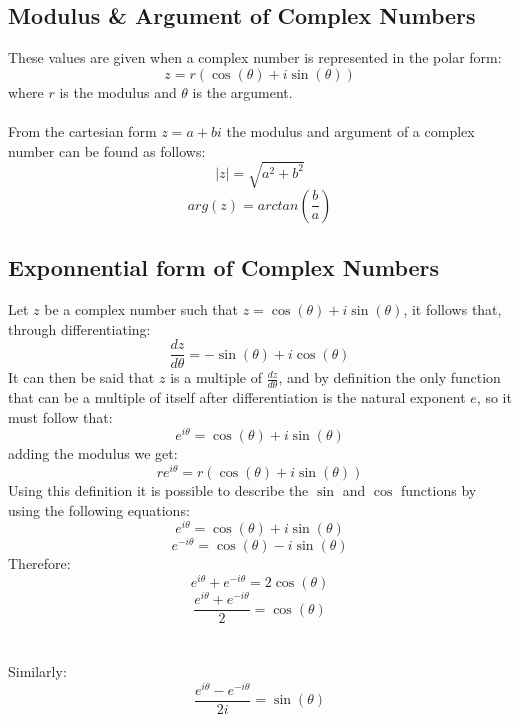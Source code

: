 \documentclass{article}
\begin{document}
                \subsection{Modulus \& Argument of Complex Numbers}
                	These values are given when a complex number is represented in the polar form:
                	\[z=r\left(\cos\left(\theta\right) + i\sin\left(\theta\right)\right)\]
                	where \(r\) is the modulus and \(\theta\) is the argument. \\\\
                	From the cartesian form \(z=a+bi\) the modulus and argument of a complex number can be found as follows:
                	\[|z|=\sqrt{a^2 + b^2}\]
                	\[arg\left(z\right) = arctan\left(\frac{b}{a}\right)\]
		\subsection{Exponnential form of Complex Numbers}
			Let \(z\) be a complex number such that \(z=\cos\left(\theta\right) +i\sin\left(\theta\right)\), it follows that, through differentiating:
			 \[\frac{dz}{d\theta}=-\sin\left(\theta\right) +i\cos\left(\theta\right)\]
			It can then be said that \(z\) is a multiple of \(\frac{dz}{d\theta}\), and by definition the only function that can be a multiple of itself after differentiation is the natural exponent \(e\), so it must follow that:
			\[e^{i\theta}=\cos\left(\theta\right) +i\sin\left(\theta\right)\]
			adding the modulus we get:
			\[re^{i\theta} = r(\cos\left(\theta\right) +i\sin\left(\theta\right))\]
			Using this definition it is possible to describe the \(\sin\) and \(\cos\) functions by using the following equations:
			\[e^{i\theta}= \cos\left(\theta\right)+i\sin\left(\theta\right)\]
			\[e^{-i\theta}=\cos\left(\theta\right)-i\sin\left(\theta\right)\]
			Therefore:
			\[e^{i\theta}+e^{-i\theta}=2\cos\left(\theta\right)\]
			\[\frac{e^{i\theta}+e^{-i\theta}}{2}=\cos\left(\theta\right)\] \\\\
			Similarly:
			\[\frac{e^{i\theta}-e^{-i\theta}}{2i}=\sin\left(\theta\right)\]
\end{document}
